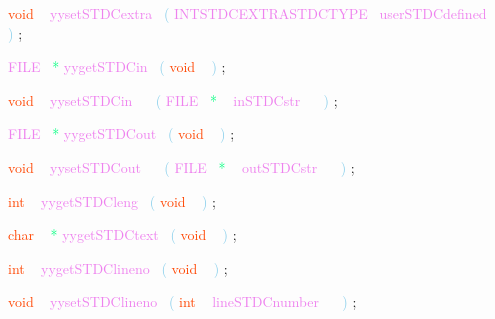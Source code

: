 \documentclass[8, usernames, dvipsnames]{beamer}
\begin{document}
\begin{frame}
\textcolor{OrangeRed}{void}
\textcolor{White}{\ }
\textcolor{Violet}{yysetSTDCextra}\textcolor{White}{\ }
\textcolor{SkyBlue}{(}
\textcolor{Violet}{INTSTDCEXTRASTDCTYPE}\textcolor{White}{\ }
\textcolor{Violet}{userSTDCdefined}\textcolor{White}{\ }
\textcolor{White}{\ }
\textcolor{SkyBlue}{)}
\textcolor{Sepia}{;}

 
 \textcolor{Violet}{FILE}\textcolor{White}{\ }
\textcolor{SpringGreen}{*}
\textcolor{Violet}{yygetSTDCin}\textcolor{White}{\ }
\textcolor{SkyBlue}{(}
\textcolor{OrangeRed}{void}
\textcolor{White}{\ }
\textcolor{SkyBlue}{)}
\textcolor{Sepia}{;}

 
 \textcolor{OrangeRed}{void}
\textcolor{White}{\ }
\textcolor{Violet}{yysetSTDCin}\textcolor{White}{\ }
\textcolor{White}{\ }
\textcolor{SkyBlue}{(}
\textcolor{Violet}{FILE}\textcolor{White}{\ }
\textcolor{SpringGreen}{*}
\textcolor{White}{\ }
\textcolor{Violet}{inSTDCstr}\textcolor{White}{\ }
\textcolor{White}{\ }
\textcolor{SkyBlue}{)}
\textcolor{Sepia}{;}

 
 \textcolor{Violet}{FILE}\textcolor{White}{\ }
\textcolor{SpringGreen}{*}
\textcolor{Violet}{yygetSTDCout}\textcolor{White}{\ }
\textcolor{SkyBlue}{(}
\textcolor{OrangeRed}{void}
\textcolor{White}{\ }
\textcolor{SkyBlue}{)}
\textcolor{Sepia}{;}

 
 \textcolor{OrangeRed}{void}
\textcolor{White}{\ }
\textcolor{Violet}{yysetSTDCout}\textcolor{White}{\ }
\textcolor{White}{\ }
\textcolor{SkyBlue}{(}
\textcolor{Violet}{FILE}\textcolor{White}{\ }
\textcolor{SpringGreen}{*}
\textcolor{White}{\ }
\textcolor{Violet}{outSTDCstr}\textcolor{White}{\ }
\textcolor{White}{\ }
\textcolor{SkyBlue}{)}
\textcolor{Sepia}{;}

 
 \end{frame}
\begin{frame}
\textcolor{OrangeRed}{int}
\textcolor{White}{\ }
\textcolor{Violet}{yygetSTDCleng}\textcolor{White}{\ }
\textcolor{SkyBlue}{(}
\textcolor{OrangeRed}{void}
\textcolor{White}{\ }
\textcolor{SkyBlue}{)}
\textcolor{Sepia}{;}

 
 \textcolor{OrangeRed}{char}
\textcolor{White}{\ }
\textcolor{SpringGreen}{*}
\textcolor{Violet}{yygetSTDCtext}\textcolor{White}{\ }
\textcolor{SkyBlue}{(}
\textcolor{OrangeRed}{void}
\textcolor{White}{\ }
\textcolor{SkyBlue}{)}
\textcolor{Sepia}{;}

 
 \textcolor{OrangeRed}{int}
\textcolor{White}{\ }
\textcolor{Violet}{yygetSTDClineno}\textcolor{White}{\ }
\textcolor{SkyBlue}{(}
\textcolor{OrangeRed}{void}
\textcolor{White}{\ }
\textcolor{SkyBlue}{)}
\textcolor{Sepia}{;}

 
 \textcolor{OrangeRed}{void}
\textcolor{White}{\ }
\textcolor{Violet}{yysetSTDClineno}\textcolor{White}{\ }
\textcolor{SkyBlue}{(}
\textcolor{OrangeRed}{int}
\textcolor{White}{\ }
\textcolor{Violet}{lineSTDCnumber}\textcolor{White}{\ }
\textcolor{White}{\ }
\textcolor{SkyBlue}{)}
\textcolor{Sepia}{;}

 
 
 
 \end{frame}
\end{document}
